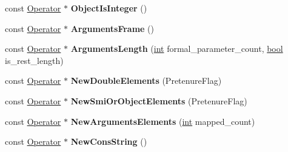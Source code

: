 \begin{DoxyCompactItemize}
const \mbox{\hyperlink{classv8_1_1internal_1_1compiler_1_1Operator}{Operator}} $\ast$ {\bfseries Object\+Is\+Integer} ()
\item 
\mbox{\label{classv8_1_1internal_1_1compiler_1_1SimplifiedOperatorBuilder_a2e3b2e527cf61efc7b0a004db87fbf1f}} 
const \mbox{\hyperlink{classv8_1_1internal_1_1compiler_1_1Operator}{Operator}} $\ast$ {\bfseries Arguments\+Frame} ()
\item 
\mbox{\label{classv8_1_1internal_1_1compiler_1_1SimplifiedOperatorBuilder_a0f11b469089ef4bb4d9f66b4a259030a}} 
const \mbox{\hyperlink{classv8_1_1internal_1_1compiler_1_1Operator}{Operator}} $\ast$ {\bfseries Arguments\+Length} (\mbox{\hyperlink{classint}{int}} formal\+\_\+parameter\+\_\+count, \mbox{\hyperlink{classbool}{bool}} is\+\_\+rest\+\_\+length)
\item 
\mbox{\label{classv8_1_1internal_1_1compiler_1_1SimplifiedOperatorBuilder_af10438808d334c8a76e4858c51ebb022}} 
const \mbox{\hyperlink{classv8_1_1internal_1_1compiler_1_1Operator}{Operator}} $\ast$ {\bfseries New\+Double\+Elements} (Pretenure\+Flag)
\item 
\mbox{\label{classv8_1_1internal_1_1compiler_1_1SimplifiedOperatorBuilder_a9eeda9e794e2f8835f0f3d677421e2c0}} 
const \mbox{\hyperlink{classv8_1_1internal_1_1compiler_1_1Operator}{Operator}} $\ast$ {\bfseries New\+Smi\+Or\+Object\+Elements} (Pretenure\+Flag)
\item 
\mbox{\label{classv8_1_1internal_1_1compiler_1_1SimplifiedOperatorBuilder_a40aeebb53acff62b317884949eb5794a}} 
const \mbox{\hyperlink{classv8_1_1internal_1_1compiler_1_1Operator}{Operator}} $\ast$ {\bfseries New\+Arguments\+Elements} (\mbox{\hyperlink{classint}{int}} mapped\+\_\+count)
\item 
\mbox{\label{classv8_1_1internal_1_1compiler_1_1SimplifiedOperatorBuilder_acde1a602746ec2e3a58a65960ee43c91}} 
const \mbox{\hyperlink{classv8_1_1internal_1_1compiler_1_1Operator}{Operator}} $\ast$ {\bfseries New\+Cons\+String} ()

\end{DoxyCompactItemize}
